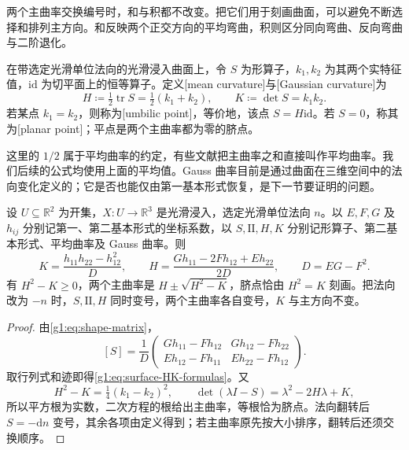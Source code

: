 两个主曲率交换编号时，和与积都不改变。把它们用于刻画曲面，可以避免不断选择和排列主方向。和反映两个正交方向的平均弯曲，积则区分同向弯曲、反向弯曲与二阶退化。

\begin{definition}\label{g1:def:surface-curvatures}
	在带选定光滑单位法向的光滑浸入曲面上，令 \(S\) 为形算子，\(k_1,k_2\) 为其两个实特征值，\(\mathrm{id}\) 为切平面上的恒等算子。定义[mean curvature]与[Gaussian curvature]为
	\[
		H\coloneqq\tfrac12\operatorname{tr}S=\tfrac12(k_1+k_2),\qquad K\coloneqq\det S=k_1k_2.
	\]
	若某点 \(k_1=k_2\)，则称为[umbilic point]，等价地，该点 \(S=H\mathrm{id}\)。若 \(S=0\)，称其为[planar point]；平点是两个主曲率都为零的脐点。
\end{definition}

这里的 \(1/2\) 属于平均曲率的约定，有些文献把主曲率之和直接叫作平均曲率。我们后续的公式均使用上面的平均值。Gauss 曲率目前是通过曲面在三维空间中的法向变化定义的；它是否也能仅由第一基本形式恢复，是下一节要证明的问题。

\begin{proposition}\label{g1:prop:surface-curvature-formulas}
	设 \(U\subseteq\mathbb R^2\) 为开集，\(X:U\to\mathbb R^3\) 是光滑浸入，选定光滑单位法向 \(n\)。以 \(E,F,G\) 及 \(h_{ij}\) 分别记第一、第二基本形式的坐标系数，以 \(S,\mathrm{II},H,K\) 分别记形算子、第二基本形式、平均曲率及 Gauss 曲率。则
	\begin{equation}\label{g1:eq:surface-HK-formulas}
		K=\frac{h_{11}h_{22}-h_{12}^2}{D},\qquad
		H=\frac{Gh_{11}-2Fh_{12}+Eh_{22}}{2D},\qquad D=EG-F^2.
	\end{equation}
	有 \(H^2-K\ge0\)，两个主曲率是 \(H\pm\sqrt{H^2-K}\)，脐点恰由 \(H^2=K\) 刻画。把法向改为 \(-n\) 时，\(S,\mathrm{II},H\) 同时变号，两个主曲率各自变号，\(K\) 与主方向不变。
\end{proposition}
\begin{proof}
	由\eqref{g1:eq:shape-matrix}，
	\[
		[S]=\frac1D
		\begin{pmatrix}
			Gh_{11}-Fh_{12}&Gh_{12}-Fh_{22}\\
			Eh_{12}-Fh_{11}&Eh_{22}-Fh_{12}
		\end{pmatrix}.
	\]
	取行列式和迹即得\eqref{g1:eq:surface-HK-formulas}。又
	\[
		H^2-K=\tfrac14(k_1-k_2)^2,\qquad
		\det(\lambda I-S)=\lambda^2-2H\lambda+K,
	\]
	所以平方根为实数，二次方程的根给出主曲率，等根恰为脐点。法向翻转后 \(S=-\mathrm dn\) 变号，其余各项由定义得到；若主曲率原先按大小排序，翻转后还须交换顺序。
\end{proof}

